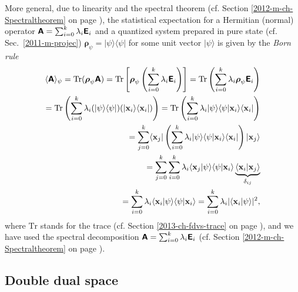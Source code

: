 {More general,  due to linearity and the spectral theorem
(cf. Section \ref{2012-m-ch-Spectraltheorem} on page \pageref{2012-m-ch-Spectraltheorem}),
the statistical expectation for a Hermitian (normal) operator $\textsf{\textbf{A}}=
\sum_{i=0}^k   \lambda_i \textsf{\textbf{E}}_i$
and a quantized system prepared in pure state
(cf. Sec.~\ref{2011-m-projec})
$\boldsymbol{\rho}_\psi = \vert {\psi}\rangle \langle \psi \vert$ for some unit vector $\vert {\psi}\rangle$
is given by the {\em Born rule}
\begin{equation}
\begin{split}
\langle \textsf{\textbf{A}}\rangle_{\psi} = \text{Tr} (\boldsymbol{\rho}_\psi \textsf{\textbf{A}})
=
\text{Tr}  \left[\boldsymbol{\rho}_\psi  \left(\sum_{i=0}^k   \lambda_i  \textsf{\textbf{E}}_i  \right)\right] =
\text{Tr}  \left(\sum_{i=0}^k   \lambda_i \boldsymbol{\rho}_\psi  \textsf{\textbf{E}}_i  \right)\\
=
 \text{Tr} \left(\sum_{i=0}^k   \lambda_i (\vert \psi \rangle \langle \psi \vert )( \vert {\bf x}_i \rangle \langle {\bf x}_i \vert )\right)
=
 \text{Tr} \left(\sum_{i=0}^k   \lambda_i  \vert \psi \rangle \langle \psi \vert   {\bf x}_i \rangle \langle {\bf x}_i \vert  \right)\\
=
\sum_{j=0}^k \langle {\bf x}_j \vert
\left(  \sum_{i=0}^k   \lambda_i  \vert \psi \rangle  \langle \psi   \vert {\bf x}_i \rangle   \langle {\bf x}_i \vert \right)   \vert{\bf x}_j \rangle    \\
=
\sum_{j=0}^k
   \sum_{i=0}^k   \lambda_i  \langle {\bf x}_j \vert \psi \rangle   \langle \psi   \vert {\bf x}_i \rangle
\underbrace{ \langle {\bf x}_i \vert    {\bf x}_j \rangle }_{\delta_{ij}}  \\
=
\sum_{i=0}^k   \lambda_i  \langle {\bf x}_i \vert \psi \rangle \langle \psi   \vert {\bf x}_i \rangle
=
\sum_{i=0}^k   \lambda_i \vert \langle {\bf x}_i \vert \psi \rangle \vert^2,
\end{split}
\label{2015-m-ch-fdlvs-bornr}
\end{equation}
where $\text{Tr}$ stands for the trace (cf. Section \ref{2013-ch-fdvs-trace} on page \pageref{2013-ch-fdvs-trace}),
and we have used the spectral decomposition $\textsf{\textbf{A}}= \sum_{i=0}^k   \lambda_i \textsf{\textbf{E}}_i$
(cf. Section \ref{2012-m-ch-Spectraltheorem} on page \pageref{2012-m-ch-Spectraltheorem}).
}


\subsection{Double dual space}
\label{2012-m-dds}

